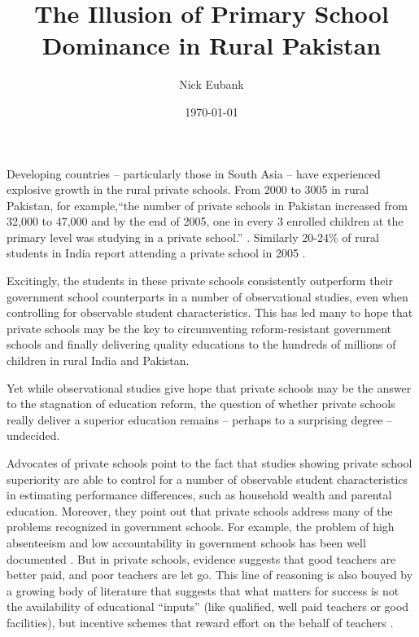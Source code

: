 \documentclass[12pt]{article}
\title{The Illusion of Primary School Dominance in Rural Pakistan}
\author{Nick Eubank}
\date{\today}
\begin{document}
 
\maketitle

Developing countries -- particularly those in South Asia -- have experienced explosive growth in the rural private schools. From 2000 to 3005 in rural Pakistan, for example,``the number of private schools in Pakistan increased from 32,000 to 47,000 and by the end of 2005, one in every 3 enrolled children at the primary level was studying in a private school.'' \citep[p. vi]{Andrabi:2007we}. Similarly 20-24\% of rural students in India report attending a private school in 2005 \citep{Pratham:2005vw}. 

Excitingly, the students in these private schools consistently outperform their government school counterparts in a number of observational studies, even when controlling for observable student characteristics.\citep{Jimenez:1991wa, Jimenez:1995vg, Pratham:2005vw, Andrabi:2011hl, Desai:2009ty, Tooley:2003vf, Alderman:2003we, Alderman:2001wk} This has led many to hope that private schools may be the key to circumventing reform-resistant government schools and finally delivering quality educations to the hundreds of millions of children in rural India and Pakistan.

Yet while observational studies give hope that private schools may be the answer to the stagnation of education reform, the question of whether private schools really deliver a superior education remains -- perhaps to a surprising degree -- undecided. 

Advocates of private schools point to the fact that studies showing private school superiority are able to control for a number of observable student characteristics in estimating performance differences, such as household wealth and parental education. Moreover, they point out that private schools address many of the problems recognized in government schools. For example, the problem of high absenteeism and low accountability in government schools has been well documented \citep{Muralidharan:2008tb, Chaudhury:2006vp}. But in private schools, evidence suggests that good teachers are better paid, and poor teachers are let go\citep{Andrabi:2007we}. This line of reasoning is also bouyed by a growing body of literature that suggests that what matters for success is not the availability of educational ``inputs'' (like qualified, well paid teachers or good facilities), but incentive schemes that reward effort on the behalf of teachers  \citep{Hanushek:1997tt}\citep{Hanushek:1997tt,Hanushek:2003hz,Banerjee:2007wx}. 
\end{document}
